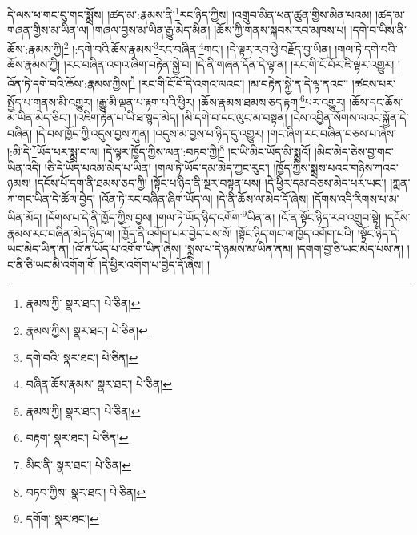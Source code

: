 དེ་ལས་ཕ་གང་བུ་གང་སྨྲོས། །ཚད་མ་:རྣམས་ནི་\footnote{རྣམས་ཀྱི་  སྣར་ཐང་།  པེ་ཅིན། }རང་ཉིད་ཀྱིས། །འགྲུབ་མིན་ཕན་ཚུན་གྱིས་མིན་པའམ། །ཚད་མ་གཞན་གྱིས་མ་ཡིན་ལ། །གཞལ་བྱས་མ་ཡིན་རྒྱུ་མེད་མིན། །ཆོས་ཀྱི་གནས་སྐབས་རབ་མཁས་པ། །དགེ་བ་ཡིས་ནི་ཆོས་:རྣམས་ཀྱི།\footnote{རྣམས་ཀྱིས།  སྣར་ཐང་།  པེ་ཅིན། } །:དགེ་བའི་ཆོས་རྣམས་\footnote{དགེ་བའི་  སྣར་ཐང་།  པེ་ཅིན། }རང་བཞིན་\footnote{བཞིན་ཆོས་རྣམས་  སྣར་ཐང་།  པེ་ཅིན། }གང་། །དེ་ལྟར་རབ་ཕྱེ་བརྗོད་བྱ་ཡིན། །གལ་ཏེ་དགེ་བའི་ཆོས་རྣམས་ཀྱི། །རང་བཞིན་འགའ་ཞིག་བརྟེན་སྐྱེ་བ། །དེ་ནི་གཞན་དོན་དེ་ལྟ་ན། །རང་གི་ངོ་བོར་ཇི་ལྟར་འགྱུར། །འོན་ཏེ་དགེ་བའི་ཆོས་:རྣམས་ཀྱིས།\footnote{རྣམས་ཀྱི།  སྣར་ཐང་།  པེ་ཅིན། } །རང་གི་ངོ་བོ་དེ་འགའ་ལའང་། །མ་བརྟེན་སྐྱེ་ན་དེ་ལྟ་ནའང་། །ཚངས་པར་སྤྱོད་པ་གནས་མི་འགྱུར། །རྒྱུ་མི་ལྡན་པ་རྟག་པའི་ཕྱིར། །ཆོས་རྣམས་ཐམས་ཅད་རྟག་\footnote{བརྟག་  སྣར་ཐང་།  པེ་ཅིན། }པར་འགྱུར། །ཆོས་དང་ཆོས་མ་ཡིན་མེད་ཅིང་། །འཇིག་རྟེན་པ་ཡི་ཐ་སྙད་མེད། །མི་དགེ་བ་དང་ལུང་མ་བསྟན། །ངེས་འབྱིན་སོགས་ལའང་སྐྱོན་དེ་བཞིན། །དེ་བས་ཁྱོད་ཀྱི་འདུས་བྱས་ཀུན། །འདུས་མ་བྱས་པ་ཉིད་དུ་འགྱུར། །གང་ཞིག་རང་བཞིན་བཅས་པ་ཞེས། །:མི་དེ་\footnote{མིང་ནི་  སྣར་ཐང་།  པེ་ཅིན། }ཡོད་པར་སྨྲ་བ་ལ། །དེ་ལྟར་ཁྱོད་ཀྱིས་ལན་:བཏབ་ཀྱི།\footnote{བཏབ་ཀྱིས།  སྣར་ཐང་།  པེ་ཅིན། } །ང་ཡི་མིང་ཡོད་མི་སྨྲའོ། །མིང་མེད་ཅེས་བྱ་གང་ཡིན་འདི། །ཅི་དེ་ཡོད་པའམ་མེད་པ་ཡིན། །གལ་ཏེ་ཡོད་དམ་མེད་ཀྱང་རུང་། །ཁྱོད་ཀྱིས་སྨྲས་པའང་གཉིས་ཀའང་ཉམས། །དངོས་པོ་དག་ནི་ཐམས་ཅད་ཀྱི། །སྟོང་པ་ཉིད་ནི་སྔར་བསྟན་པས། །དེ་ཕྱིར་དམ་བཅས་མེད་པར་ཡང་། །ཀླན་ཀ་གང་ཡིན་དེ་ཚོལ་བྱེད། །འོན་ཏེ་རང་བཞིན་ཞིག་ཡོད་ལ། །དེ་ནི་ཆོས་ལ་མེད་དོ་ཞེས། །དོགས་འདི་རིགས་པ་མ་ཡིན་མོད། །དོགས་པ་དེ་ནི་ཁྱོད་ཀྱིས་བྱས། །གལ་ཏེ་ཡོད་ཉིད་འགོག་\footnote{དགོག་  སྣར་ཐང་། }ཡིན་ན། །འོ་ན་སྟོང་ཉིད་རབ་འགྲུབ་སྟེ། །དངོས་རྣམས་རང་བཞིན་མེད་ཉིད་ལ། །ཁྱོད་ནི་འགོག་པར་བྱེད་པས་སོ། །སྟོང་ཉིད་གང་ལ་ཁྱོད་འགོག་པའི། །སྟོང་ཉིད་དེ་ཡང་མེད་ཡིན་ན། །འོ་ན་ཡོད་པ་འགོག་ཡིན་ཞེས། །སྨྲས་པ་དེ་ཉམས་མ་ཡིན་ནམ། །དགག་བྱ་ཅི་ཡང་མེད་པས་ན། །ང་ནི་ཅི་ཡང་མི་འགོག་གོ །དེ་ཕྱིར་འགོག་པ་བྱེད་དོ་ཞེས། །
